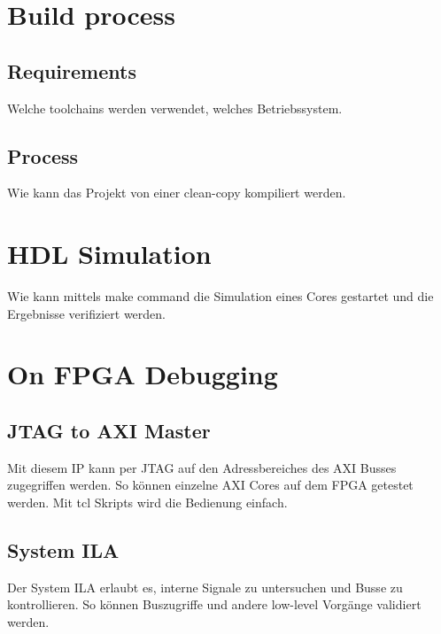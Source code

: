 \section{Build process}

\subsection{Requirements}
Welche toolchains werden verwendet, welches Betriebssystem.

\subsection{Process}
Wie kann das Projekt von einer clean-copy kompiliert werden.

\section{HDL Simulation}
Wie kann mittels make command die Simulation eines Cores gestartet und die Ergebnisse
verifiziert werden.

\section{On FPGA Debugging}

\subsection{JTAG to AXI Master}
Mit diesem IP kann per JTAG auf den Adressbereiches des AXI Busses zugegriffen werden.
So können einzelne AXI Cores auf dem FPGA getestet werden. Mit tcl Skripts 
wird die Bedienung einfach.

\subsection{System ILA}
Der System ILA erlaubt es, interne Signale zu untersuchen und Busse zu kontrollieren.
So können Buszugriffe und andere low-level Vorgänge validiert werden.

